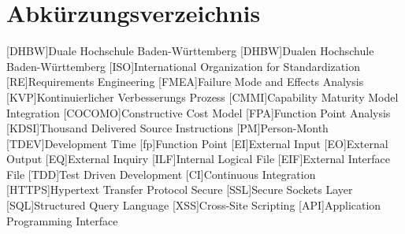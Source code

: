 \section*{Abkürzungsverzeichnis}
\begin{acronym}
  [DHBW]{Duale Hochschule Ba\-den-\-Würt\-tem\-berg}
  [DHBW]{Dualen Hochschule Ba\-den-\-Würt\-tem\-berg}
  [ISO]{International Organization for Standardization}
  [RE]{Requirements Engineering}
  [FMEA]{Failure Mode and Effects Analysis}
  [KVP]{Kontinuierlicher Verbesserungs Prozess}
  [CMMI]{Capability Maturity Model Integration}
  [COCOMO]{Constructive Cost Model}
  [FPA]{Function Point Analysis}
  [KDSI]{Thousand Delivered Source Instructions}
  [PM]{Person-Month}
  [TDEV]{Development Time}
  [fp]{Function Point}
  [EI]{External Input}
  [EO]{External Output}
  [EQ]{External Inquiry}
  [ILF]{Internal Logical File}
  [EIF]{External Interface File}
  [TDD]{Test Driven Development}
  [CI]{Continuous Integration}
  [HTTPS]{Hypertext Transfer Protocol Secure}
  [SSL]{Secure Sockets Layer}
  [SQL]{Structured Query Language}
  [XSS]{Cross-Site Scripting}
  [API]{Application Programming Interface}
\end{acronym}
\newpage